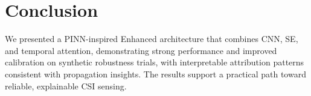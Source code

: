 \documentclass[journal]{IEEEtran}
\begin{document}
\section{Conclusion}
We presented a PINN-inspired Enhanced architecture that combines CNN, SE, and temporal attention, demonstrating strong performance and improved calibration on synthetic robustness trials, with interpretable attribution patterns consistent with propagation insights. The results support a practical path toward reliable, explainable CSI sensing.



\end{document}
